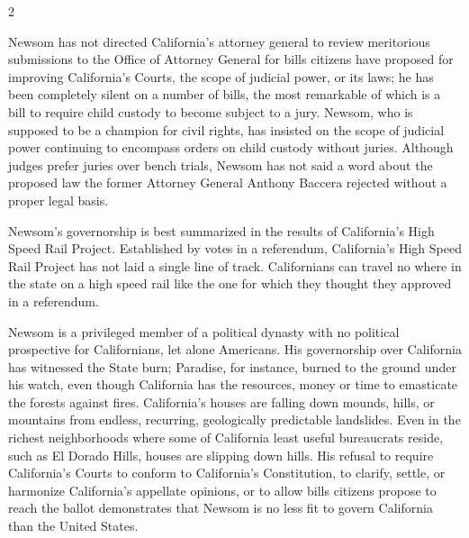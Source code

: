 \documentclass[10pt,a4paper,twoside]{article} %
\begin{document}
\begin{multicols}{2}
{\newline \indent Newsom has not directed California's attorney general to review meritorious submissions to the Office of Attorney General for bills citizens have proposed for improving California's Courts, the scope of judicial power, or its laws; he has been completely silent on a number of bills, the most remarkable of which is a bill to require child custody to become subject to a jury. Newsom, who is supposed to be a champion for civil rights, has insisted on the scope of judicial power continuing to encompass orders on child custody without juries. Although judges prefer juries over bench trials, Newsom has not said a word about the proposed law the former Attorney General Anthony Baccera rejected without a proper legal basis. 

\newline \indent  Newsom's governorship is best summarized in the results of California's High Speed Rail Project. Established by votes in a referendum, California's High Speed Rail Project has not laid a single line of track. Californians can travel no where in the state on a high speed rail like the one for which they thought they approved in a referendum. 

\newline \indent Newsom is a privileged member of a political dynasty with no political prospective for Californians, let alone Americans. His governorship over California has witnessed the State burn; Paradise, for instance, burned to the ground under his watch, even though California has the resources, money or time to emasticate the forests against fires. California's houses are falling down mounds, hills, or mountains from endless, recurring, geologically predictable landslides. Even in the richest neighborhoods where some of California least useful bureaucrats reside, such as El Dorado Hills, houses are slipping down hills. His refusal to require California's Courts to conform to California's Constitution, to clarify, settle, or harmonize California's appellate opinions, or to allow bills citizens propose to reach the ballot demonstrates that Newsom is no less fit to govern California than the United States. 

}
\end{multicols}
\end{document}

